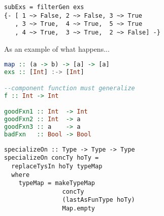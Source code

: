 \begin{verbatim}
subExs = filterGen exs
{- [ 1 ~> False, 2 ~> False, 3 ~> True
   , 3 ~> True,  4 ~> True,  5 ~> True
   , 4 ~> True,  3 ~> True,  2 ~> False] -}
\end{verbatim}


As an example of what happens...
\begin{lstlisting}[language=haskell]
map :: (a -> b) -> [a] -> [a]
exs :: [Int] :-> [Int]

--component function must generalize
f :: Int -> Int

goodFxn1 :: Int  -> Int
goodFxn2 :: Int  -> a
goodFxn3 :: a    -> a
badFxn   :: Bool -> Bool
\end{lstlisting}


\begin{comment}
\subsubsection{Extending Liquid Haskell}\label{extLiqHask}
\markk{MARVIN - write something that makes more sense here}
LiquidHaskell does not support certain popular syntax extensions to Haskell, such as LambdaCase (TODO list others). 

In the spirit of this work, we wish to support as much user defined code as possible. To this end, we can extend the refinement type system by allowing refinement type inference on representative examples of a higher order function. Take the following code \markk{find something from an actual library on hackage.}

\begin{lstlisting}
{-# LANGAUGE LambdaCase #-}
fooMap :: (a -> b) -> [a] -> [b]
fooMap f = \case
  [] -> []
  l -> map f l
 \end{lstlisting}

We generate and applying many examples with QuickCheck for each higher order function.
We then apply a similar refinement type inference strategy as above to these examples.
This lets us support a larger subset of the language, and, in theory refinement type inference for other languages too!

There are however repercussions to this approach. We are not guaranteed to generate a correct refinement type because we might not generate a fully representative examples. So we might prune away high order functions that are actually useful. 


\end{comment}











\begin{lstlisting}
specializeOn :: Type -> Type -> Type
specializeOn concTy hoTy =
  replaceTysIn hoTy typeMap
  where
    typeMap = makeTypeMap 
                concTy 
                (lastAsFunType hoTy)
                Map.empty
\end{lstlisting}